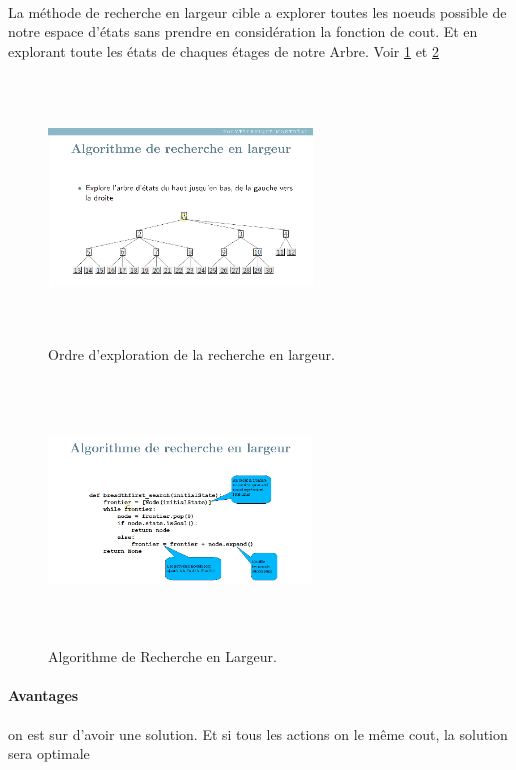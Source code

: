 \documentclass[oneside]{book}
\begin{document}
\paragraph{}
La méthode de recherche en largeur cible a explorer toutes les noeuds possible de notre espace d'états sans prendre en considération la fonction de cout. Et en explorant toute les états de chaques étages de notre Arbre. Voir \ref{fig:Recherche_en_largeur} et \ref{fig:Algo_Recherche_en_largeur}

\begin{figure}[!ht]
\centering
\includegraphics[width = 7cm, height = 7cm, keepaspectratio]{Recherche_Largeur.png}
\caption{Ordre d'exploration de la recherche en largeur.}
\label{fig:Recherche_en_largeur}
\end{figure}

\begin{figure}[!ht]
\centering
\includegraphics[width = 7cm, height = 7cm, keepaspectratio]{algo_largeur.png}
\caption{Algorithme de Recherche en Largeur.}
\label{fig:Algo_Recherche_en_largeur}
\end{figure}
\paragraph{Avantages}
on est sur d'avoir une solution. Et si tous les actions on le même cout, la solution sera optimale
\end{document}
